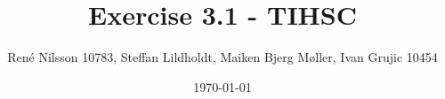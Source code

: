 \documentclass[]{report}
\begin{document}
\title{Exercise 3.1 - TIHSC}
\author{René Nilsson 10783, Steffan Lildholdt, Maiken Bjerg Møller, Ivan Grujic 10454}
\date{\today}
\maketitle
{}

\tableofcontents










\end{document}
